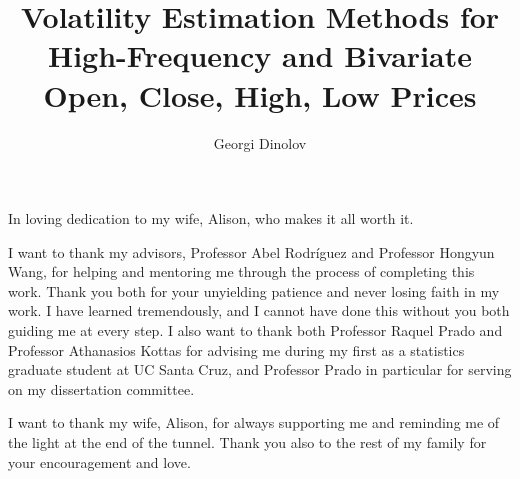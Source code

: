 

\def\newblock{\hskip .11em plus.33em minus.07em}



\title{Volatility Estimation Methods for High-Frequency and Bivariate
  Open, Close, High, Low Prices} \author{Georgi Dinolov}
  
 
\deanlinethree{}

\begin{frontmatter}
\maketitle

\copyrightpage

\tableofcontents

\listoffigures

\listoftables

\begin{abstract}

\end{abstract}

\begin{dedication}
\vspace*{\fill}
\begin{center}
  In loving dedication to my wife, Alison, who makes it all worth it.
\end{center}
\vspace*{\fill}
\end{dedication}

\begin{acknowledgements}
  I want to thank my advisors, Professor Abel Rodr\'iguez and
  Professor Hongyun Wang, for helping and mentoring me through the
  process of completing this work. Thank you both for your unyielding
  patience and never losing faith in my work. I have learned
  tremendously, and I cannot have done this without you both guiding
  me at every step. I also want to thank both Professor Raquel Prado
  and Professor Athanasios Kottas for advising me during my first as a
  statistics graduate student at UC Santa Cruz, and Professor Prado in
  particular for serving on my dissertation committee.

  I want to thank my wife, Alison, for always supporting me and
  reminding me of the light at the end of the tunnel. Thank you also
  to the rest of my family for your encouragement and love.
\end{acknowledgements}

\end{frontmatter}

